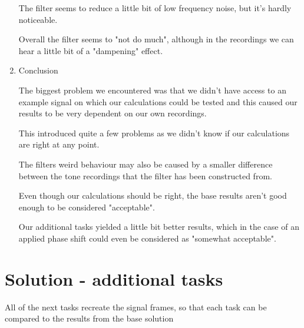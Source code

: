 \documentclass[a4paper, 11pt]{article}
\begin{document}
\begin{enumerate}
        The filter seems to reduce a little bit of low frequency noise, but it's hardly noticeable.

        Overall the filter seems to "not do much",
        although in the recordings we can hear a little bit of a "dampening" effect.

        \item
        Conclusion

        The biggest problem we encountered was that we didn't have access to an example signal
        on which our calculations could be tested and this caused our results to be very dependent
        on our own recordings.

        This introduced quite a few problems
        as we didn't know if our calculations are right at any point.

        The filters weird behaviour may also be caused by a smaller difference between the tone recordings
        that the filter has been constructed from.

        Even though our calculations should be right, the base results aren't good enough to be considered "acceptable".

        Our additional tasks yielded a little bit better results,
        which in the case of an applied phase shift could even be considered as "somewhat acceptable".

    \end{enumerate}

    \newpage
    \section*{Solution - additional tasks}

    All of the next tasks recreate the signal frames,
    so that each task can be compared to the results from the base solution
\end{document}
